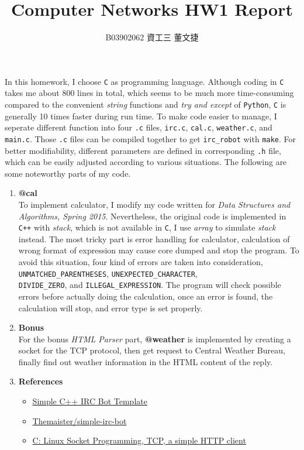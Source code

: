 \documentclass[12pt, a4paper]{article}
\date{}
\title{\vspace{-3.0cm} Computer Networks HW1 Report \\ \vspace{0.5cm}}
\author{\normalsize B03902062 資工三 \hspace{0cm} 董文捷}
\begin{document}
\maketitle
In this homework, I choose \texttt{C} as programming language. Although coding in \texttt{C} takes me about 800 lines in total, which seems to be much more time-consuming compared to the convenient \textit{string} functions and \textit{try and except} of \texttt{Python}, \texttt{C} is generally 10 times faster during run time. To make code easier to manage, I seperate different function into four \texttt{.c} files, \texttt{irc.c}, \texttt{cal.c}, \texttt{weather.c}, and \texttt{main.c}. Those \texttt{.c} files can be compiled together to get \texttt{irc\_robot} with \texttt{make}. For better modifiability, different parameters are defined in corresponding \texttt{.h} file, which can be easily adjusted according to various situations. The following are some noteworthy parts of my code.

\begin{enumerate}[1.]

\item
{\bf @cal} \\
To implement calculator, I modify my code written for \textit{Data Structures and Algorithms, Spring 2015}. Nevertheless, the original code is implemented in \texttt{C++} with \textit{stack}, which is not available in \texttt{C}, I use \textit{array} to simulate \textit{stack} instead. The most tricky part is error handling for calculator, calculation of wrong format of expression may cause core dumped and stop the program. To avoid this situation, 
four kind of errors are taken into consideration, \texttt{UNMATCHED\_PARENTHESES}, \texttt{UNEXPECTED\_CHARACTER}, \\ \texttt{DIVIDE\_ZERO}, and \texttt{ILLEGAL\_EXPRESSION}. The program will check possible errors before actually doing the calculation, once an error is found, the calculation will stop, and error type is set properly.
 
\item
{\bf Bonus} \\
For the bonus \textit{HTML Parser} part, {\bf @weather} is implemented by creating a socket for the TCP protocol, then get request to Central Weather Bureau, finally find out weather information in the HTML content of the reply. 

\item
{\bf References}
\begin{itemize}
\item \href{http://www.the-tech-tutorial.com/simple-c-irc-bot-template/}{Simple C++ IRC Bot Template}
\item \href{https://github.com/Themaister/simple-irc-bot}{Themaister/simple-irc-bot}
\item \href{http://coding.debuntu.org/c-linux-socket-programming-tcp-simple-http-client}{C: Linux Socket Programming, TCP, a simple HTTP client}
\end{itemize}

\end{enumerate}
\end{document}
